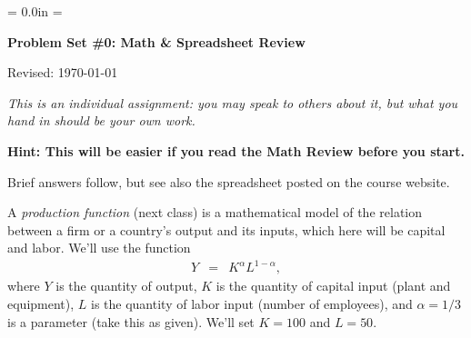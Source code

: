 \documentclass[12pt]{exam}
\def\HeadName{Problem Set \#0}
\renewcommand{\log}{\ln}
\begin{document}
\parindent = 0.0in
\parskip = \bigskipamount
\thispagestyle{empty}%
\Head

\centerline{\large \bf \HeadName: Math \& Spreadsheet Review}
\centerline{Revised:  \today}

\medskip
{\it This is an individual assignment:  you may speak to others about it,
but what you hand in should be your own work.}

{\bf Hint:  This will be easier if you read the Math Review before you start.}

\begin{questions}

\begin{solution}
Brief answers follow,
but see also the spreadsheet posted on the course website.
\end{solution}

A {\it production function\/} (next class) is a mathematical
model of the relation between a firm or a country's output
and its inputs, which here will be capital and labor.
We'll use the function
\begin{eqnarray}
    Y &=& K^\alpha L^{1-\alpha} ,
    \label{eq:production}
\end{eqnarray}
where $Y$ is the quantity of output,
$K$ is the quantity of capital input (plant and equipment),
$L$ is the quantity of labor input (number of employees),
and $\alpha = 1/3$ is a parameter (take this as given).
We'll set $K=100$ and $L = 50$.

\end{questions}
\end{document}
